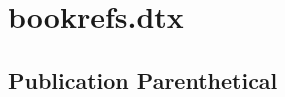 \documentclass{article}
\makeatletter
\def\hi@newcite#1#2#3{}
\makeatother
\begin{document}
\hi@newcite\defcitecontainer{A citation in another citation}{%
    \hi@citecontainer@settype
    \edef\reserved@a{%
        {#1}%
        \expandafter\noexpand\csname tc@#1\endcsname
        \hi@ifset\hi@kv@citation{%
            \expandafter\noexpand\csname tc@\hi@kv@citation\endcsname
            \expandafter\noexpand\csname fc@\hi@kv@citation\endcsname
        }{\relax\relax}%
    }%
    \expandafter\hi@citecontainer@init\reserved@a
    \edef\reserved@a{%
        {#1}%
        \expandafter\noexpand\csname fc@#1\endcsname
        \expandafter\noexpand\csname tcpg@\hi@kv@in\endcsname
    }%
    \expandafter\hi@citecontainer@fc\reserved@a
    \edef\reserved@a{%
        {#1}%
        \expandafter\noexpand\csname sc@#1\endcsname
        \hi@ifset\hi@kv@citation{%
            \expandafter\noexpand\csname sc@\hi@kv@citation\endcsname
        }{\relax}%
    }%
    \expandafter\hi@citecontainer@sc\reserved@a
    \edef\reserved@a{%
        {#1}%
        \expandafter\noexpand\csname lc@#1\endcsname
        \hi@ifset\hi@kv@citation{%
            \expandafter\noexpand\csname
                \@ifundefined{lc@\hi@kv@citation}{fc}{lc}@\hi@kv@citation
            \endcsname
        }{\relax}%
        \expandafter\noexpand\csname fc@\hi@kv@in\endcsname
        \expandafter\noexpand\csname hi@citecontainer@data@#1\endcsname
    }
    \expandafter\hi@citecontainer@lc\reserved@a
}

\section{bookrefs.dtx}

\subsection{Publication Parenthetical}
\end{document}
